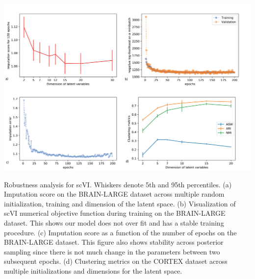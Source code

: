 \begin{suppfigure}
\centering
\includegraphics[width=\textwidth]{figures/stability_figure.png}
\caption[Robustness analysis for scVI]{Robustness analysis for scVI. Whiskers denote 5th and 95th percentiles. (a) Imputation score on the BRAIN-LARGE dataset across multiple random initialization, training and dimension of the latent space. (b) Visualization of scVI numerical objective function during training on the BRAIN-LARGE dataset. This shows our model does not over fit and has a stable training procedure. (c) Imputation score as a function of the number of epochs on the BRAIN-LARGE dataset. This figure also shows stability across posterior sampling since there is not much change in the parameters between two subsequent epochs. (d) Clustering metrics on the CORTEX dataset across multiple initializations and dimensions for the latent space.}
\label{scvirobustness}
\end{suppfigure}


